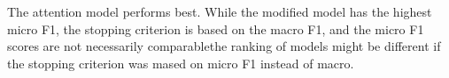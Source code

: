 The attention model performs best. While the modified model has the highest
micro F1, the stopping criterion is based on the macro F1, and the micro
F1 scores are not necessarily comparable\textemdash the ranking of models might be
different if the stopping criterion was mased on micro F1 instead of macro.
